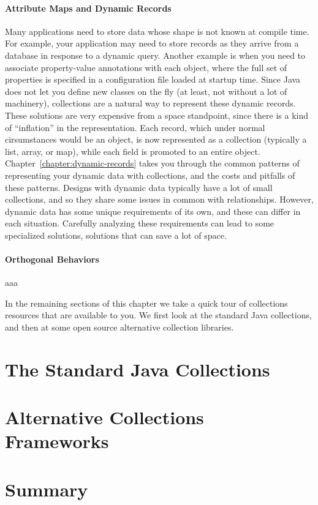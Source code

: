 \paragraph{Attribute Maps and Dynamic Records}
Many applications need to store data whose shape is not
known at compile time. For example, your application may need to store  
records as they arrive from a database in response to a dynamic query. Another
example is when you need to associate property-value annotations with
each object, where the full set of properties is specified in a configuration
file loaded at startup time.
Since Java does not let you define new classes on the fly (at
least, not without a lot of machinery), collections are a natural way to
represent these dynamic records. These solutions are very expensive from a
space standpoint, since there is a kind of ``inflation'' in the representation. 
Each record, which under normal cirsumstances would be an object, is
now represented as a collection (typically a list, array, or map), while each
field is promoted to an entire object.
Chapter~\ref{chapter:dynamic-records} takes you through the
common patterns of representing your dynamic data with collections, and
the costs and pitfalls of these patterns. Designs with dynamic data typically 
have a lot of small collections, and so they share some issues in
common with relationships. However, dynamic data has some unique requirements of its
own, and these can differ in each situation. Carefully analyzing these
requirements can lead to some specialized solutions, solutions that can save a
lot of space.

\paragraph{Orthogonal Behaviors}
aaa

In the remaining sections of this chapter we take a quick tour of collections
resources that are available to you.  We first look at the standard Java
collections, and then at some open source alternative collection
libraries.

\section{The Standard Java Collections}

\section{Alternative Collections Frameworks}


\section{Summary}


